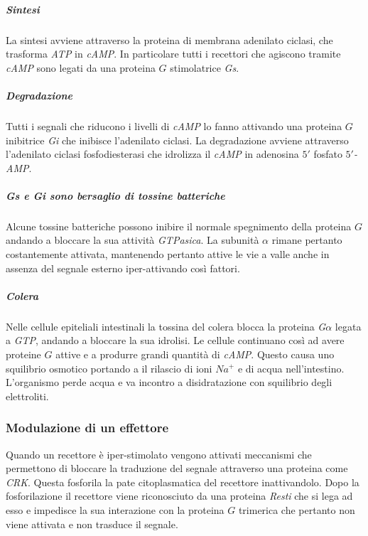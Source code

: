 				\subparagraph{Sintesi}
				La sintesi avviene attraverso la proteina di membrana adenilato ciclasi, che trasforma \emph{ATP} in \emph{cAMP}.
				In particolare tutti i recettori che agiscono tramite \emph{cAMP} sono legati da una proteina $G$ stimolatrice \emph{Gs}.
				
				\subparagraph{Degradazione}
				Tutti i segnali che riducono i livelli di \emph{cAMP} lo fanno attivando una proteina $G$ inibitrice \emph{Gi} che inibisce l'adenilato ciclasi.
				La degradazione avviene attraverso l'adenilato ciclasi fosfodiesterasi che idrolizza il \emph{cAMP} in adenosina $5'$ fosfato \emph{$5'$-AMP}.

				\subparagraph{\emph{Gs} e \emph{Gi} sono bersaglio di tossine batteriche}
				Alcune tossine batteriche possono inibire il normale spegnimento della proteina $G$ andando a bloccare la sua attivit\`a \emph{GTPasica}.
				La subunit\`a $\alpha$ rimane pertanto costantemente attivata, mantenendo pertanto attive le vie a valle anche in assenza del segnale esterno iper-attivando cos\`i fattori.
				
				\subparagraph{Colera}
				Nelle cellule epiteliali intestinali la tossina del colera blocca la proteina \emph{G$\alpha$} legata a \emph{GTP}, andando a bloccare la sua idrolisi.
				Le cellule continuano cos\`i ad avere proteine $G$ attive e a produrre grandi quantit\`a di \emph{cAMP}.
				Questo causa uno squilibrio osmotico portando a il rilascio di ioni \emph{$Na^+$} e di acqua nell'intestino.
				L'organismo perde acqua e va incontro a disidratazione con squilibrio degli elettroliti.

		\subsubsection{Modulazione di un effettore}
		Quando un recettore \`e iper-stimolato vengono attivati meccanismi che permettono di bloccare la traduzione del segnale attraverso una proteina come \emph{CRK}.
		Questa fosforila la pate citoplasmatica del recettore inattivandolo.
		Dopo la fosforilazione il recettore viene riconosciuto da una proteina \emph{Resti} che si lega ad esso e impedisce la sua interazione con la proteina $G$ trimerica che pertanto non viene attivata e non trasduce il segnale.

